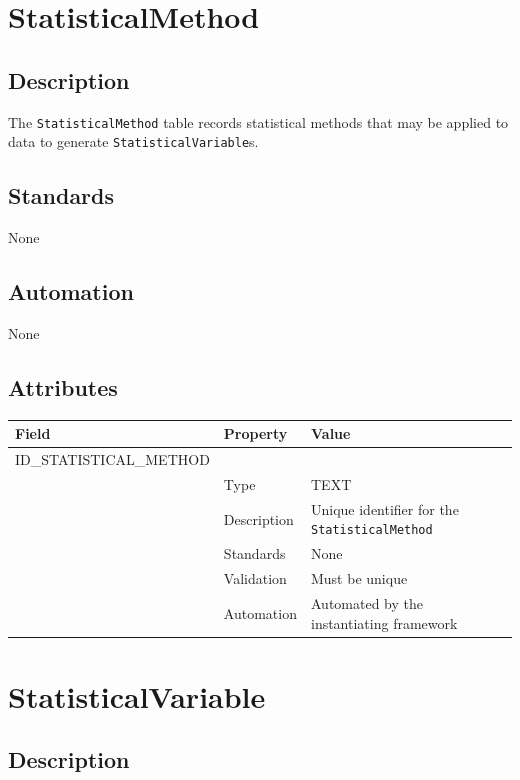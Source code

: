 \documentclass[
]{article}
\newcounter{none}
\begin{document}
\section{StatisticalMethod}\label{statisticalmethod}

\subsection{Description}\label{description-29}

The \texttt{StatisticalMethod} table records statistical methods that
may be applied to data to generate \texttt{StatisticalVariable}s.

\subsection{Standards}\label{standards-31}

None

\subsection{Automation}\label{automation-31}

None

\subsection{Attributes}\label{attributes-26}

{\def\LTcaptype{none} 
\begin{longtable}[]{@{}lll@{}}
\toprule\noalign{}
Field & Property & Value \\
\midrule\noalign{}
\endhead
\bottomrule\noalign{}
\endlastfoot
ID\_STATISTICAL\_METHOD & & \\
& Type & TEXT \\
& Description & Unique identifier for the \texttt{StatisticalMethod} \\
& Standards & None \\
& Validation & Must be unique \\
& Automation & Automated by the instantiating framework \\
\end{longtable}
}

\section{StatisticalVariable}\label{statisticalvariable}

\subsection{Description}\label{description-30}
\end{document}
